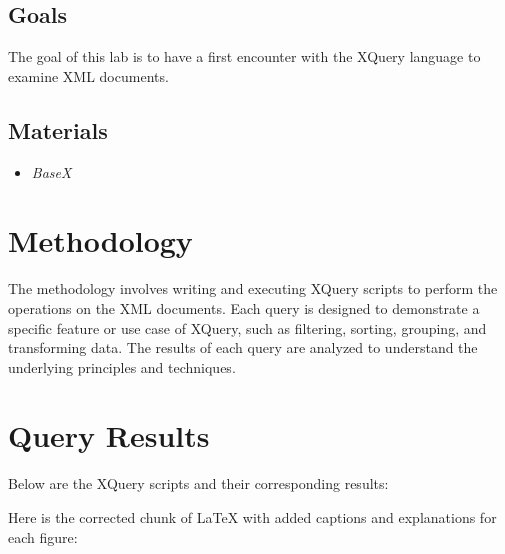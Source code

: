 \documentclass[twoside]{article}
\begin{document}
\subsection*{Goals}
The goal of this lab is to have a first encounter with the XQuery language to examine XML
documents.

\subsection*{Materials}
\begin{itemize}
	\item \textit{BaseX}
\end{itemize}

\section{Methodology}
The methodology involves writing and executing XQuery scripts to perform the operations on the XML documents. Each query is designed to demonstrate a specific feature or use case of XQuery, such as filtering, sorting, grouping, and transforming data. The results of each query are analyzed to understand the underlying principles and techniques.

\section{Query Results}
Below are the XQuery scripts and their corresponding results:

Here is the corrected chunk of LaTeX with added captions and explanations for each figure:
\end{document}
